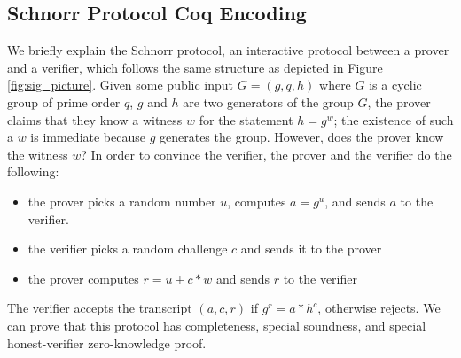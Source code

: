 \documentclass[conference,compsoc]{IEEEtran}
\begin{document}
\subsection{Schnorr Protocol Coq Encoding}
  We briefly explain the Schnorr protocol, an interactive protocol 
  between a prover and a verifier, which follows the same structure as 
  depicted in Figure \ref{fig:sig_picture}. 
  Given some public input $G = (g, q, h)$ where $G$
  is a cyclic group of prime order $q$, $g$ and $h$ are two 
  generators of the group $G$, the prover claims that they know a
  witness $w$ for the statement $h = g^w$; the existence of such
  a $w$ is immediate because $g$ generates the group. However,
  does the prover know the witness $w$? In order to convince the
  verifier, the prover and the verifier do the following:
  \begin{itemize}
    \item the prover picks a random number $u$, computes $a = g^u$,
    and sends $a$ to the verifier.
    \item the verifier picks a random challenge $c$ and sends it to
    the prover
    \item the prover computes $r = u + c * w$ and sends $r$ to the
    verifier
  \end{itemize}

The verifier accepts the transcript $(a, c, r)$ if $g^r = a * h^c$, otherwise rejects. We can prove that 
this protocol has completeness, special soundness, and special honest-verifier 
zero-knowledge proof. 
\end{document}
